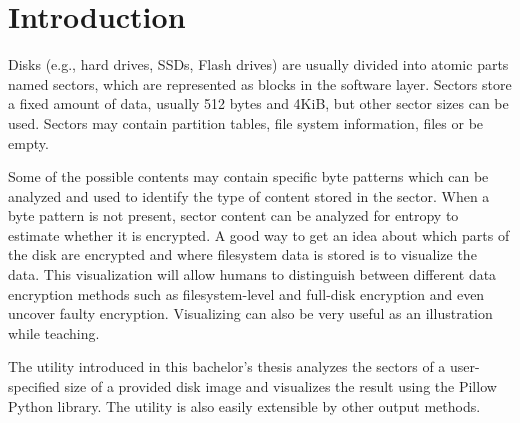 \documentclass[
  digital, %
  oneside, %
  lof,     %
  lot,     %
]{fithesis4}
\begin{document}

\chapter*{Introduction}
Disks (e.g., hard drives, SSDs, Flash drives)  are usually divided into atomic parts named sectors, which are represented as blocks in the software layer.
Sectors store a fixed amount of data, usually 512 bytes and 4KiB, but other sector sizes can be used.
Sectors may contain partition tables, file system information, files or be empty.

Some of the possible contents may contain specific byte patterns which can be analyzed and used to identify the type of content stored in the sector.
When a byte pattern is not present, sector content can be analyzed for entropy to estimate whether it is encrypted.
A good way to get an idea about which parts of the disk are encrypted and where filesystem data is stored is to visualize the data.
This visualization will allow humans to distinguish between different data encryption methods such as filesystem-level and full-disk encryption and even uncover faulty encryption. %
Visualizing can also be very useful as an illustration while teaching.

The utility introduced in this bachelor's thesis analyzes the sectors of a user-specified size of a provided disk image and visualizes the result using the Pillow Python library.
The utility is also easily extensible by other output methods.
\end{document}
